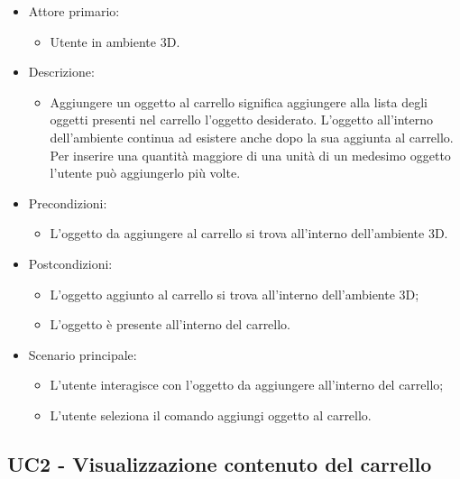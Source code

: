 \begin{itemize}

	\item Attore primario: 
	\begin{itemize}
		\item Utente in ambiente 3D.
	\end{itemize}
	\item Descrizione:
	\begin{itemize}
		\item Aggiungere un oggetto al carrello significa aggiungere alla lista degli oggetti presenti nel carrello l'oggetto desiderato.
\newline L'oggetto all'interno dell'ambiente continua ad esistere anche dopo la sua aggiunta al carrello.
\newline Per inserire una quantità maggiore di una unità di un medesimo oggetto l'utente può aggiungerlo più volte.
	\end{itemize}
	
	\item Precondizioni:
	\begin{itemize}
		\item L'oggetto da aggiungere al carrello si trova all'interno dell'ambiente 3D.
	\end{itemize}
	
	\item Postcondizioni:
	\begin{itemize}
		\item L'oggetto aggiunto al carrello si trova all'interno dell'ambiente 3D;
		\item L'oggetto è presente all'interno del carrello.
	\end{itemize}
	
	\item Scenario principale:
	\begin{itemize}
		\item L'utente interagisce con l'oggetto da aggiungere all'interno del carrello;
		\item L'utente seleziona il comando aggiungi oggetto al carrello.
	\end{itemize}
	
\end{itemize}

\pagebreak

\subsection{UC2 - Visualizzazione contenuto del carrello}

